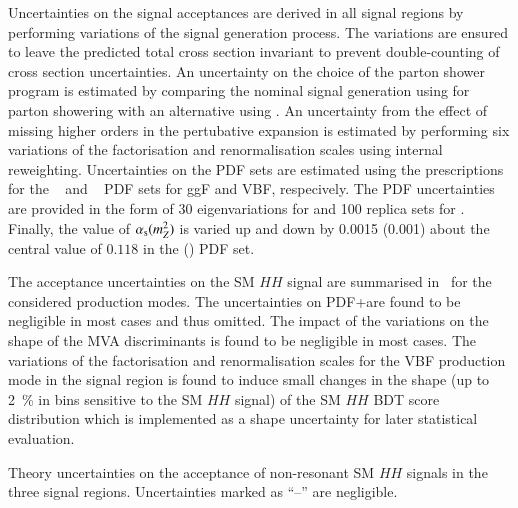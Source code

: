 
Uncertainties on the signal acceptances are derived in all signal
regions by performing variations of the signal generation process. The
variations are ensured to leave the predicted total cross section
invariant to prevent double-counting of cross section
uncertainties. An uncertainty on the choice of the parton shower
program is estimated by comparing the nominal signal generation using
\PYTHIA[8.244] for parton showering with an alternative using
\HERWIG[7.1.6]. An uncertainty from the effect of missing higher
orders in the pertubative expansion is estimated by performing six
variations of the factorisation and renormalisation scales using
internal reweighting. Uncertainties on the PDF sets are estimated
using the prescriptions for the
\PDFforLHC[15nlo]~\cite{Butterworth:2015oua} and
\NNPDF[3.0nlo]~\cite{Ball:2014uwa} PDF sets for ggF and VBF,
respecively. The PDF uncertainties are provided in the form of 30
eigenvariations for \PDFforLHC[15nlo] and 100 replica sets for
\NNPDF[3.0nlo]. Finally, the value of $\alpha_{\text{s}}(m_{Z}^2)$ is varied up
and down by 0.0015 (0.001) about the central value of $0.118$ in the
\PDFforLHC[15nlo] (\NNPDF[3.0nlo]) PDF set.


The acceptance uncertainties on the SM $HH$ signal are summarised
in~ for the considered production
modes. The uncertainties on PDF+\alphas are found to be negligible in
most cases and thus omitted. The impact of the variations on the shape
of the MVA discriminants is found to be negligible in most cases. The
variations of the factorisation and renormalisation scales for the VBF
production mode in the \hadhad signal region is found to induce small
changes in the shape (up to \SI{2}{\percent} in bins sensitive to the
SM $HH$ signal) of the SM $HH$ BDT score distribution which is
implemented as a shape uncertainty for later statistical evaluation.

\begin{table}[htbp]
  \centering

  

  \caption{Theory uncertainties on the acceptance of non-resonant SM
    $HH$ signals in the three signal regions. Uncertainties marked as
    ``--'' are negligible.}
  \label{tab:theory_uncertainty_signal}
\end{table}

